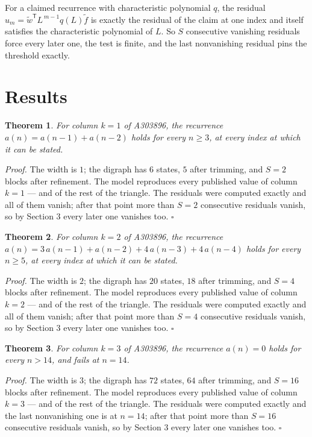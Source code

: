 \documentclass[11pt]{article}
\newtheorem{theorem}{Theorem}
\theoremstyle{definition}
\begin{document}
For a claimed recurrence with characteristic polynomial $q$, the residual $u_m = \tilde w^{\mathsf T}L^{\,m-1}q(L)\tilde f$ is exactly the residual of the claim at one index and itself satisfies the characteristic polynomial of $L$. So $S$ consecutive vanishing residuals force every later one, the test is finite, and the last nonvanishing residual pins the threshold exactly.

\section{Results}

\begin{theorem} For column $k = 1$ of A303896, the recurrence $a(n) = a(n-1) + a(n-2)$ holds for every $n \ge 3$, at every index at which it can be stated.\end{theorem}

{\itshape Proof.} The width is $1$; the digraph has $6$ states, $5$ after trimming, and $S = 2$ blocks after refinement. The model reproduces every published value of column $k = 1$ --- and of the rest of the triangle. The residuals were computed exactly and all of them vanish; after that point more than $S = 2$ consecutive residuals vanish, so by Section 3 every later one vanishes too. $\square$

\begin{theorem} For column $k = 2$ of A303896, the recurrence $a(n) = 3\,a(n-1) + a(n-2) + 4\,a(n-3) + 4\,a(n-4)$ holds for every $n \ge 5$, at every index at which it can be stated.\end{theorem}

{\itshape Proof.} The width is $2$; the digraph has $20$ states, $18$ after trimming, and $S = 4$ blocks after refinement. The model reproduces every published value of column $k = 2$ --- and of the rest of the triangle. The residuals were computed exactly and all of them vanish; after that point more than $S = 4$ consecutive residuals vanish, so by Section 3 every later one vanishes too. $\square$

\begin{theorem} For column $k = 3$ of A303896, the recurrence $a(n) = 0$ holds for every $n > 14$, and fails at $n = 14$.\end{theorem}

{\itshape Proof.} The width is $3$; the digraph has $72$ states, $64$ after trimming, and $S = 16$ blocks after refinement. The model reproduces every published value of column $k = 3$ --- and of the rest of the triangle. The residuals were computed exactly and the last nonvanishing one is at $n = 14$; after that point more than $S = 16$ consecutive residuals vanish, so by Section 3 every later one vanishes too. $\square$
\end{document}

